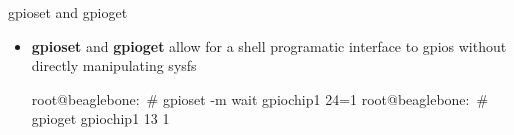 \begin{frame}
   {gpioset and gpioget}
   \begin{itemize}
      \item \textbf{gpioset} and \textbf{gpioget} allow for a shell programatic 
	      interface to gpios without directly manipulating sysfs
      \begin{raw}
root@beaglebone:~# gpioset -m wait gpiochip1 24=1
root@beaglebone:~# gpioget gpiochip1 13
1
      \end{raw}
   \end{itemize}
\end{frame}

\cprotect\note{


}

